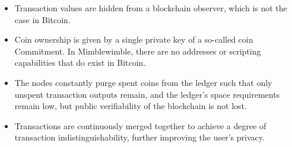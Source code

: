 \begin{itemize}
    \item Transaction values are hidden from a blockchain observer, which is not the case in Bitcoin.
    \item Coin ownership is given by a single private key of a so-called coin Commitment.
    In Mimblewimble, there are no addresses or scripting capabilities that do exist in Bitcoin.
    \item The nodes constantly purge spent coins from the ledger such that only unspent transaction outputs remain, and the ledger's space requirements remain low, but public verifiability of the blockchain is not lost.
    \item Transactions are continuously merged together to achieve a degree of transaction indistinguishability, further improving the user's privacy.
\end{itemize}


